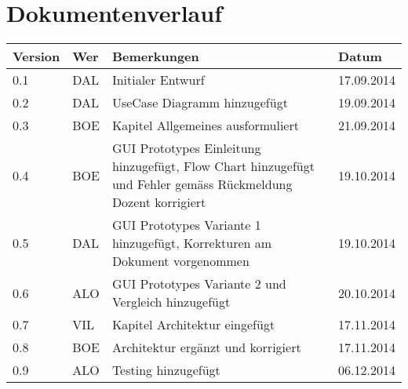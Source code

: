 \newpage
\section*{Dokumentenverlauf}
\begin{center}
	\begin{tabular}{  llp{9cm}l }
		\textbf{Version} & \textbf{Wer} & \textbf{Bemerkungen} & \textbf{Datum} \\\hline
		0.1 & DAL & Initialer Entwurf & 17.09.2014 \\
		0.2 & DAL & UseCase Diagramm hinzugefügt & 19.09.2014 \\
		0.3 & BOE & Kapitel Allgemeines ausformuliert & 21.09.2014 \\
		0.4 & BOE & GUI Prototypes Einleitung hinzugefügt, Flow Chart hinzugefügt und Fehler gemäss Rückmeldung Dozent korrigiert & 19.10.2014 \\
		0.5 & DAL & GUI Prototypes Variante 1 hinzugefügt, Korrekturen am Dokument vorgenommen & 19.10.2014 \\
		0.6 & ALO & GUI Prototypes Variante 2 und Vergleich hinzugefügt & 20.10.2014 \\
		0.7 & VIL & Kapitel Architektur eingefügt & 17.11.2014 \\
		0.8 & BOE & Architektur ergänzt und korrigiert & 17.11.2014 \\
		0.9 & ALO & Testing hinzugefügt & 06.12.2014 \\
	\end{tabular}
\end{center}
\newpage